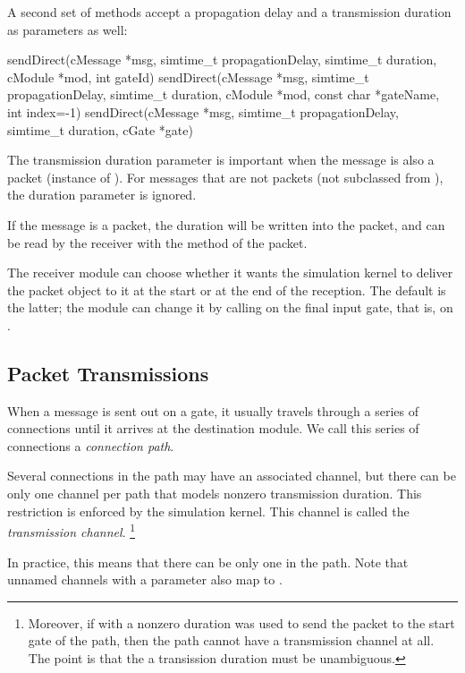 A second set of  methods accept a propagation
delay and a transmission duration as parameters as well:

\begin{cpp}
sendDirect(cMessage *msg, simtime_t propagationDelay, simtime_t duration,
           cModule *mod, int gateId)
sendDirect(cMessage *msg, simtime_t propagationDelay, simtime_t duration,
           cModule *mod, const char *gateName, int index=-1)
sendDirect(cMessage *msg, simtime_t propagationDelay, simtime_t duration,
           cGate *gate)
\end{cpp}

The transmission duration parameter is important when the message is also
a packet (instance of ). For messages that are not packets
(not subclassed from ), the duration parameter
is ignored.

If the message is a packet, the duration will be written into the packet,
and can be read by the receiver with the  method of
the packet.

The receiver module can choose whether it wants the simulation kernel
to deliver the packet object to it at the start or at the end of the
reception. The default is the latter; the module can change it by calling
 on the final input gate, that is, on
.


\subsection{Packet Transmissions}
\label{sec:simple-modules:packet-transmission}

When a message is sent out on a gate, it usually travels through
a series of connections until it arrives at the destination module.
We call this series of connections a \textit{connection path}.

Several connections in the path may have an associated channel,
but there can be only one channel per path that models nonzero
transmission duration. This restriction is enforced by the simulation
kernel. This channel is called the \textit{transmission channel}.
  \footnote{Moreover, if  with a nonzero duration
  was used to send the packet to the start gate of the path,
  then the path cannot have a transmission channel at all.
  The point is that the a transission duration must be unambiguous.}

\begin{note}
  In practice, this means that there can be only one 
  in the path. Note that unnamed channels with a  parameter
  also map to .
\end{note}

